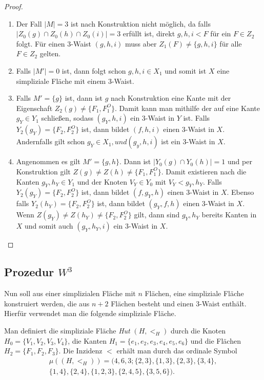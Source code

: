 \documentclass[12pt,titlepage]{article}
\begin{document}
\begin{proof}
\begin{enumerate}
\item Der Fall $\vert M \vert=3$ ist nach Konstruktion nicht möglich, da falls $\vert Z_0(g) \cap Z_0(h)\cap Z_0(i)\vert =3 $ erfüllt ist,  direkt $g,h,i <F$ für ein $F \in Z_2$ folgt. Für einen 3-Waist $(g,h,i)$ muss aber $Z_1(F) \neq \{g,h,i\} $ für alle $F \in Z_2$ gelten.
\item Falls $\vert M' \vert=0$ ist, dann folgt schon $g,h,i \in X_1$ und somit ist $X$ eine simpliziale Fläche mit einem 3-Waist.
\item  Falls $M'=\{g\}$ ist, dann ist $g$ nach Konstruktion eine Kante mit der Eigenschaft $ Z_2(g) \neq \{F_1,F_1^O\}$. Damit kann man mithilfe der  auf eine Kante $g_Y\in Y_1$ schließen, sodass $(g_Y,h,i)$ ein 3-Waist in $Y$ ist. Falls $Y_2(g_Y)=\{F_2,F_2^O\}$ ist, dann bildet $(f,h,i)$ einen 3-Waist in $X$. Andernfalls gilt schon $g_Y \in X_1, und (g_y,h,i)$ ist ein 3-Waist in $X$.
\item Angenommen es gilt $  M' =\{g,h\}$. Dann ist $\vert Y_0(g) \cap Y_0(h)\vert =1$ und per Konstruktion gilt $Z(g)\neq Z(h) \neq \{F_1,F_1^O\}$. Damit existieren nach  die Kanten $g_Y,h_Y \in Y_1$ und der Knoten $V_Y\in Y_0$ mit $V_Y<g_Y,h_Y$. Falls $Y_2(g_Y)=\{F_2,F_2^O\}$ ist, dann bildet $(f,g_Y,h)$ einen 3-Waist in $X$. Ebenso falls $Y_2(h_Y)=\{F_2,F_2^O\}$ ist, dann bildet $(g_Y,f,h)$ einen 3-Waist in $X$. Wenn $Z(g_Y)\neq Z(h_Y) \neq \{F_2,F_2^O\}$ gilt, dann sind $g_Y,h_Y$ bereits Kanten in $X$ und somit auch $(g_Y,h_Y,i)$ ein 3-Waist in $X$.\end{enumerate}
\end{proof}
\subsection{Prozedur $W^3$}
Nun soll aus einer simplizialen Fläche mit $n$ Flächen, eine simpliziale Fläche konstruiert werden, die aus $n+2$ Flächen besteht und einen 3-Waist enthält. Hierfür verwendet man die folgende simpliziale Fläche.

\begin{definition}
Man definiert die simpliziale Fläche \emph{Hut} $(H,<_{H})$ durch die Knoten $H_0=\{V_1,V_2,V_3,V_4\}$, die Kanten $H_1=\{e_1,e_2,e_3,e_4,e_5,e_6\}$ und die Flächen $H_2=\{F_1,F_2,F_3\}$. Die Inzidenz $<$ erhält man durch das ordinale Symbol
\begin{align*}
\mu((H,<_H))=(4,6,3;\{2,3\},\{1,3\},\{2,3\},\{3,4\},\\
\{1,4\},\{2,4\},
 \{1,2,3\},\{2,4,5\},\{3,5,6\}).
\end{align*}
\end{definition}
\end{document}
